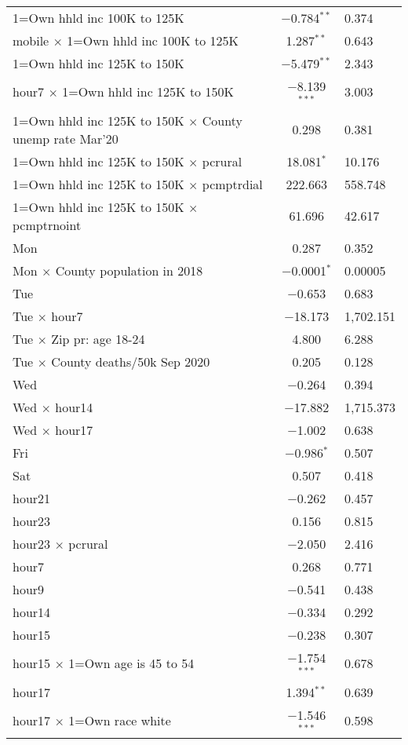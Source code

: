 \begin{table}[!htbp]
\begin{tabular}{@{\extracolsep{5pt}}lc}
  1=Own hhld inc 100K to 125K & $-$0.784$^{**}$ & 0.374 \\ 
  mobile $\times$ 1=Own hhld inc 100K to 125K & 1.287$^{**}$ & 0.643 \\ 
  1=Own hhld inc 125K to 150K & $-$5.479$^{**}$ & 2.343 \\ 
  hour7 $\times$ 1=Own hhld inc 125K to 150K & $-$8.139$^{***}$ & 3.003 \\ 
  1=Own hhld inc 125K to 150K $\times$ County unemp rate Mar'20 & 0.298 & 0.381 \\ 
  1=Own hhld inc 125K to 150K $\times$ pcrural & 18.081$^{*}$ & 10.176 \\ 
  1=Own hhld inc 125K to 150K $\times$ pcmptrdial & 222.663 & 558.748 \\ 
  1=Own hhld inc 125K to 150K $\times$ pcmptrnoint & 61.696 & 42.617 \\ 
  Mon & 0.287 & 0.352 \\ 
  Mon $\times$ County population in 2018 & $-$0.0001$^{*}$ & 0.00005 \\ 
  Tue & $-$0.653 & 0.683 \\ 
  Tue $\times$ hour7 & $-$18.173 & 1,702.151 \\ 
  Tue $\times$ Zip pr: age 18-24 & 4.800 & 6.288 \\ 
  Tue $\times$ County deaths/50k Sep 2020 & 0.205 & 0.128 \\ 
  Wed & $-$0.264 & 0.394 \\ 
  Wed $\times$ hour14 & $-$17.882 & 1,715.373 \\ 
  Wed $\times$ hour17 & $-$1.002 & 0.638 \\ 
  Fri & $-$0.986$^{*}$ & 0.507 \\ 
  Sat & 0.507 & 0.418 \\ 
  hour21 & $-$0.262 & 0.457 \\ 
  hour23 & 0.156 & 0.815 \\ 
  hour23 $\times$ pcrural & $-$2.050 & 2.416 \\ 
  hour7 & 0.268 & 0.771 \\ 
  hour9 & $-$0.541 & 0.438 \\ 
  hour14 & $-$0.334 & 0.292 \\ 
  hour15 & $-$0.238 & 0.307 \\ 
  hour15 $\times$ 1=Own age is 45 to 54 & $-$1.754$^{***}$ & 0.678 \\ 
  hour17 & 1.394$^{**}$ & 0.639 \\ 
  hour17 $\times$ 1=Own race white & $-$1.546$^{***}$ & 0.598 \\ 

\end{tabular}
\end{table}
